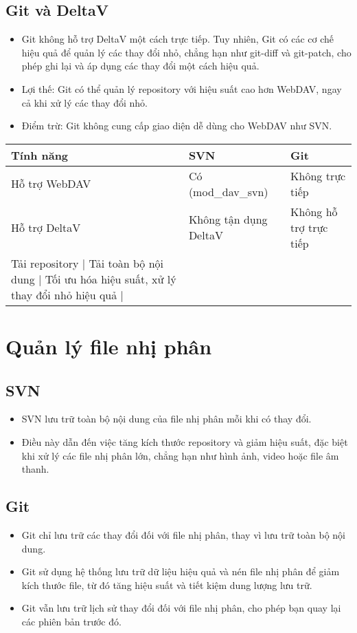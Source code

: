 \subsection{Git và DeltaV}
\begin{itemize}
    \item Git không hỗ trợ DeltaV một cách trực tiếp. Tuy nhiên, Git có các cơ chế hiệu quả để quản lý các thay đổi nhỏ, chẳng hạn như git-diff và git-patch, cho phép ghi lại và áp dụng các thay đổi một cách hiệu quả.
    \item Lợi thế: Git có thể quản lý repository với hiệu suất cao hơn WebDAV, ngay cả khi xử lý các thay đổi nhỏ.
    \item Điểm trừ: Git không cung cấp giao diện dễ dùng cho WebDAV như SVN.
\end{itemize}
\begin{tabular}{|l|l|l|}
\hline
Tính năng & SVN & Git \\ \hline
Hỗ trợ WebDAV &  Có (mod_dav_svn) & Không trực tiếp \\ \hline
Hỗ trợ DeltaV &  Không tận dụng DeltaV & Không hỗ trợ trực tiếp \\ \hline
Tải repository | Tải toàn bộ nội dung | Tối ưu hóa hiệu suất, xử lý thay đổi nhỏ hiệu quả |
\hline
\end{tabular}
\section{Quản lý file nhị phân}
\subsection{SVN}
\begin{itemize}
    \item SVN lưu trữ toàn bộ nội dung của file nhị phân mỗi khi có thay đổi.
    \item Điều này dẫn đến việc tăng kích thước repository và giảm hiệu suất, đặc biệt khi xử lý các file nhị phân lớn, chẳng hạn như hình ảnh, video hoặc file âm thanh.
\end{itemize}

\subsection{Git}
\begin{itemize}
    \item Git chỉ lưu trữ các thay đổi đối với file nhị phân, thay vì lưu trữ toàn bộ nội dung.
    \item Git sử dụng hệ thống lưu trữ dữ liệu hiệu quả và nén file nhị phân để giảm kích thước file, từ đó tăng hiệu suất và tiết kiệm dung lượng lưu trữ.
    \item Git vẫn lưu trữ lịch sử thay đổi đối với file nhị phân, cho phép bạn quay lại các phiên bản trước đó.
\end{itemize}


